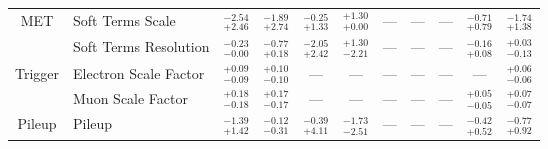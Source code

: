 \begin{tabular}{|cl||ccccccc|c||c|}
\hline
\multirow{2}{*}{MET}
&Soft Terms Scale &  $^{-2.54}_{+2.46}$  &  $^{-1.89}_{+2.74}$  &  $^{-0.25}_{+1.33}$  &  $^{+1.30}_{+0.00}$  & --- & --- & --- &  $^{-0.71}_{+0.79}$  &  $^{-1.74}_{+1.38}$ \\ 
\cline{2-11}
&Soft Terms Resolution &  $^{-0.23}_{-0.00}$  &  $^{-0.77}_{+0.18}$  &  $^{-2.05}_{+2.42}$  &  $^{+1.30}_{-2.21}$  & --- & --- & --- &  $^{-0.16}_{+0.08}$  &  $^{+0.03}_{-0.13}$ \\ 
\hline
\multirow{2}{*}{Trigger}
&Electron Scale Factor &  $^{+0.09}_{-0.09}$  &  $^{+0.10}_{-0.10}$  & --- & --- & --- & --- & --- & --- &  $^{+0.06}_{-0.06}$ \\ 
\cline{2-11}
&Muon Scale Factor &  $^{+0.18}_{-0.18}$  &  $^{+0.17}_{-0.17}$  & --- & --- & --- & --- & --- &  $^{+0.05}_{-0.05}$  &  $^{+0.07}_{-0.07}$ \\ 
\hline
\multirow{1}{*}{Pileup}
&Pileup &  $^{-1.39}_{+1.42}$  &  $^{-0.12}_{-0.31}$  &  $^{-0.39}_{+4.11}$  &  $^{-1.73}_{-2.51}$  & --- & --- & --- &  $^{-0.42}_{+0.52}$  &  $^{-0.77}_{+0.92}$ \\ 
\hline
\end{tabular}
